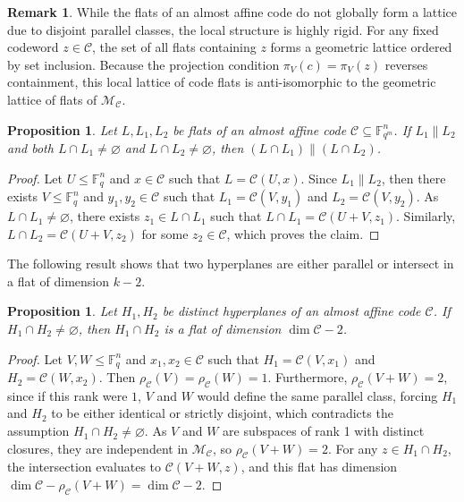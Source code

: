 \documentclass[a4paper,11pt,reqno]{article}
\newcommand{\F}{\mathbb{F}}
\newcommand{\M}{\mathcal{M}}
\newcommand{\C}{\mathcal{C}}
\theoremstyle{plain} \numberwithin{equation}{section}
\newtheorem{proposition}[theorem]{Proposition}
\theoremstyle{definition}
\newtheorem{remark}[theorem]{Remark}
\begin{document}
\begin{remark}
    While the flats of an almost affine code do not globally form a lattice due to disjoint parallel classes, the local structure is highly rigid. For any fixed codeword $z\in \C$, the set of all flats containing $z$ forms a geometric lattice ordered by set inclusion. Because the projection condition $\pi_V(c) = \pi_V(z)$ reverses containment, this local lattice of code flats is anti-isomorphic to the geometric lattice of flats of $\M_\C$.
\end{remark}

\begin{proposition}
    Let $L,L_1,L_2$ be flats of an almost affine code $\C\subseteq \F_{q^m}^n$. If $L_1 \| L_2$ and both $L\cap L_1 \neq \varnothing$ and $L\cap L_2 \neq \varnothing$, then $(L\cap L_1) \| (L\cap L_2)$.
\end{proposition}
\begin{proof}
    Let $U\leq \F_q^n$ and $x\in \C$ such that $L = \C(U,x)$. Since $L_1 \| L_2$, then there exists $V\leq \F_q^n$ and $y_1,y_2\in \C$ such that $L_1 = \C(V,y_1)$ and $L_2 = \C(V,y_2)$. As $L\cap L_1 \neq \varnothing$, there exists $z_1\in L\cap L_1$ such that $L\cap L_1 = \C(U+V,z_1)$. Similarly, $L \cap L_2 = \C(U+V,z_2)$ for some $z_2\in \C$, which proves the claim.
\end{proof}

The following result shows that two hyperplanes are either parallel or intersect in a flat of dimension $k-2$.

\begin{proposition}
    Let $H_1,H_2$ be distinct hyperplanes of an almost affine code $\C$. If $H_1\cap H_2 \neq \varnothing$, then $H_1 \cap H_2$ is a flat of dimension $\dim \C -2$.
\end{proposition}
\begin{proof}
    Let $V,W\leq \F_q^n$ and $x_1,x_2\in \C$ such that $H_1 = \C(V,x_1)$ and $H_2 = \C(W,x_2)$. Then $\rho_\C(V) = \rho_\C(W)=1$. Furthermore, $\rho_\C(V+W) = 2$, since if this rank were $1$, $V$ and $W$ would define the same parallel class, forcing $H_1$ and $H_2$ to be either identical or strictly disjoint, which contradicts the assumption $H_1 \cap H_2 \neq \varnothing$. As $V$ and $W$ are subspaces of rank 1 with distinct closures, they are independent in $\M_\C$, so $\rho_\C(V+W)=2$. For any $z\in H_1\cap H_2$, the intersection evaluates to $\C(V+W,z)$, and this flat has dimension $\dim \C-\rho_\C(V+W) = \dim \C-2$.
\end{proof}
\end{document}
